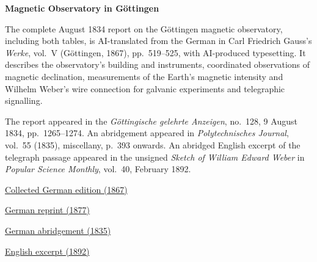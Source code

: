 \clearpage
\thispagestyle{empty}
\begin{center}\Large\textbf{Magnetic Observatory in Göttingen}\end{center}

The complete August 1834 report on the Göttingen magnetic observatory, including both tables, is AI-translated from the German in Carl Friedrich Gauss’s \textit{Werke}, vol.~V (Göttingen, 1867), pp.~519--525, with AI-produced typesetting. It describes the observatory’s building and instruments, coordinated observations of magnetic declination, measurements of the Earth’s magnetic intensity and Wilhelm Weber’s wire connection for galvanic experiments and telegraphic signalling.

The report appeared in the \textit{Göttingische gelehrte Anzeigen}, no.~128, 9 August 1834, pp.~1265--1274. An abridgement appeared in \textit{Polytechnisches Journal}, vol.~55 (1835), miscellany, p.~393 onwards. An abridged English excerpt of the telegraph passage appeared in the unsigned \textit{Sketch of William Edward Weber} in \textit{Popular Science Monthly}, vol.~40, February 1892.

\medskip\noindent
\href{https://gdz.sub.uni-goettingen.de/id/PPN236006339}{Collected German edition (1867)}\par
\noindent\href{https://doi.org/10.1007/978-3-642-49319-5_28}{German reprint (1877)}\par
\noindent\href{https://dingler.bbaw.de/articles/mi055069_1.html}{German abridgement (1835)}\par
\noindent\href{https://en.wikisource.org/w/index.php?title=Popular_Science_Monthly/Volume_40/February_1892/Sketch_of_William_Edward_Weber\&oldid=8847389}{English excerpt (1892)}
\clearpage
